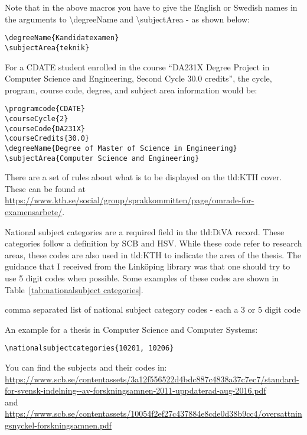 Note that in the above macros you have to give the English or Swedish names in the arguments to \textbackslash degreeName and \textbackslash subjectArea - as shown below:
\begin{lstlisting}
\degreeName{Kandidatexamen}
\subjectArea{teknik}
\end{lstlisting}

For a CDATE student enrolled in the course ``DA231X Degree Project in Computer Science and Engineering, Second Cycle 30.0 credits'', the cycle, program, course code, degree, and subject area information would be:
\begin{lstlisting}
\programcode{CDATE}
\courseCycle{2}
\courseCode{DA231X}
\courseCredits{30.0}
\degreeName{Degree of Master of Science in Engineering}
\subjectArea{Computer Science and Engineering}
\end{lstlisting}

There are a set of rules about what is to be displayed on the \gls{tld:KTH} cover. These can be found at \url{https://www.kth.se/social/group/sprakkommitten/page/omrade-for-examensarbete/}.

National subject categories are a required field in the \gls{tld:DiVA} record. These categories follow a definition by SCB and HSV. 
While these code refer to research areas, these codes are also used in \gls{tld:KTH} to indicate the area of the thesis. The guidance that I received from the Linköping library was that one should try to use 5 digit codes when possible. Some examples of these codes are shown in Table~\ref{tab:nationalsubject categories}.
\begin{description}[leftmargin=!, labelwidth =\widthof{\texttt{\textbackslash nationalsubjectcategories\{\}}}]
\item [\texttt{\textbackslash nationalsubjectcategories\{\}}] comma separated list of national subject category codes - each a 3 or 5 digit code
\end{description}

An example for a thesis in Computer Science and Computer Systems:
\begin{lstlisting}
\nationalsubjectcategories{10201, 10206}
\end{lstlisting}

You can find the subjects and their codes in:\\ \url{https://www.scb.se/contentassets/3a12f556522d4bdc887c4838a37c7ec7/standard-for-svensk-indelning--av-forskningsamnen-2011-uppdaterad-aug-2016.pdf}\\
and\\
\url{https://www.scb.se/contentassets/10054f2ef27c437884e8cde0d38b9cc4/oversattningsnyckel-forskningsamnen.pdf}

